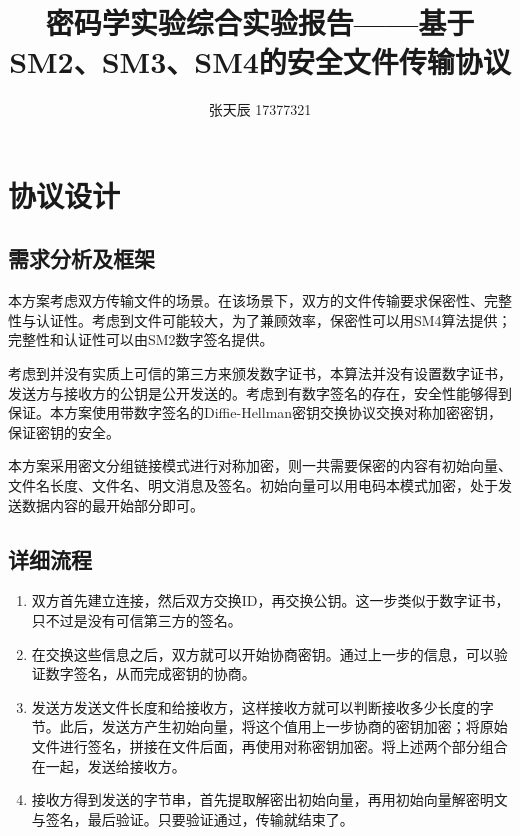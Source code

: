 \documentclass[11pt]{ctexart}
\title{密码学实验综合实验报告——基于SM2、SM3、SM4的安全文件传输协议}
\author{张天辰 17377321}
\begin{document}
\maketitle{}
\section{协议设计} %
\label{sec:协议设计}
\subsection{需求分析及框架} %
\label{sub:需求分析及框架}
本方案考虑双方传输文件的场景。在该场景下，双方的文件传输要求保密性、完整性与认证性。考虑到文件可能较大，为了兼顾效率，保密性可以用SM4算法提供；完整性和认证性可以由SM2数字签名提供。

考虑到并没有实质上可信的第三方来颁发数字证书，本算法并没有设置数字证书，发送方与接收方的公钥是公开发送的。考虑到有数字签名的存在，安全性能够得到保证。本方案使用带数字签名的Diffie-Hellman密钥交换协议交换对称加密密钥，保证密钥的安全。

本方案采用密文分组链接模式进行对称加密，则一共需要保密的内容有初始向量、文件名长度、文件名、明文消息及签名。初始向量可以用电码本模式加密，处于发送数据内容的最开始部分即可。
\subsection{详细流程} %
\label{sub:详细流程}
\begin{enumerate}
    \item 双方首先建立连接，然后双方交换ID，再交换公钥。这一步类似于数字证书，只不过是没有可信第三方的签名。
    \item 在交换这些信息之后，双方就可以开始协商密钥。通过上一步的信息，可以验证数字签名，从而完成密钥的协商。
    \item 发送方发送文件长度和给接收方，这样接收方就可以判断接收多少长度的字节。此后，发送方产生初始向量，将这个值用上一步协商的密钥加密；将原始文件进行签名，拼接在文件后面，再使用对称密钥加密。将上述两个部分组合在一起，发送给接收方。
    \item 接收方得到发送的字节串，首先提取解密出初始向量，再用初始向量解密明文与签名，最后验证。只要验证通过，传输就结束了。
\end{enumerate}
\newpage{}
\newpage{}
\end{document}
